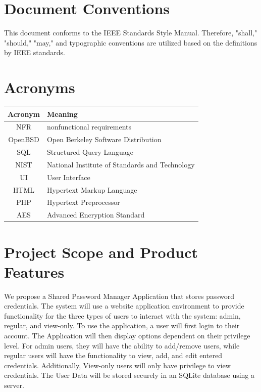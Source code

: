 \documentclass[letterpaper,12pt,oneside,listof=totoc]{scrreprt}
\begin{document}
\section{Document Conventions}
This document conforms to the IEEE Standards Style Manual. Therefore, "shall," "should," "may," and typographic conventions are utilized based on the definitions by IEEE standards.

\section{Acronyms}
\begin{tabular}{| c | p{}|}
\hline
Acronym & Meaning\\
\hline
NFR & nonfunctional requirements \\
\hline
OpenBSD & Open Berkeley Software Distribution \\
\hline
SQL & Structured Query Language \\
\hline
NIST & National Institute of Standards and Technology \\
\hline
UI & User Interface \\
\hline
HTML & Hypertext Markup Language \\
\hline
PHP & Hypertext Preprocessor \\
\hline
AES & Advanced Encryption Standard \\
\hline
\end{tabular}
 \newline

\section{Project Scope and Product Features}
We propose a Shared Password Manager Application that stores password credentials. The system will use a website application environment to provide functionality for the three types of users to interact with the system: admin, regular, and view-only. 
To use the application, a user will first login to their account. The Application will then display options dependent on their privilege level. For admin users, they will have the ability to add/remove users, while regular users will have the functionality to view, add, and edit entered credentials. Additionally, View-only users will only have privilege to view credentials. The User Data will be stored securely in an SQLite database using a server. 
\end{document}
